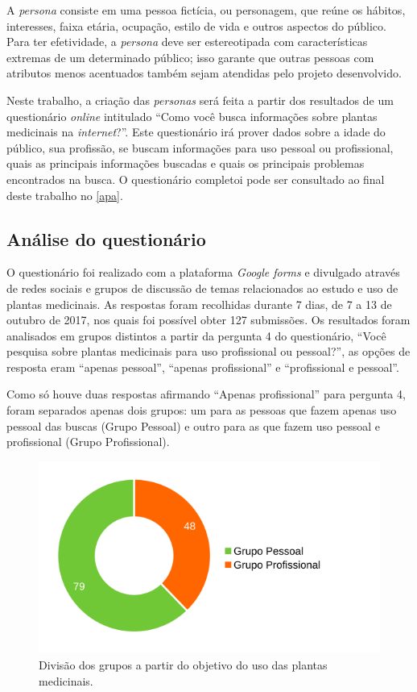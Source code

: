 A \emph{persona} consiste em uma pessoa fictícia, ou personagem, que reúne os hábitos, interesses, faixa etária, ocupação, estilo de vida e outros aspectos do público. Para ter efetividade, a \emph{persona} deve ser estereotipada com características extremas de um determinado público; isso garante que outras pessoas com atributos menos acentuados também sejam atendidas pelo projeto desenvolvido.

Neste trabalho, a criação das \emph{personas} será feita a partir dos resultados de um questionário \emph{online} intitulado ``Como você busca informações sobre plantas medicinais na \emph{internet}?''. Este questionário irá prover dados sobre a idade do público, sua profissão, se buscam informações para uso pessoal ou profissional, quais as principais informações buscadas e quais os principais problemas encontrados na busca. O questionário completoi pode ser consultado ao final deste trabalho no \autoref{apa}.

\subsection{Análise do questionário}\label{analise-do-questionario}

O questionário foi realizado com a plataforma \emph{Google forms} e divulgado através de redes sociais e grupos de discussão de temas relacionados ao estudo e uso de plantas medicinais. As respostas foram recolhidas durante 7 dias, de 7 a 13 de outubro de 2017, nos quais foi possível obter 127 submissões. Os resultados foram analisados em grupos distintos a partir da pergunta 4 do questionário, ``Você pesquisa sobre plantas medicinais para uso profissional ou pessoal?'', as opções de resposta eram ``apenas pessoal'', ``apenas profissional'' e ``profissional e pessoal''.

Como só houve duas respostas afirmando ``Apenas profissional'' para pergunta 4, foram separados apenas dois grupos: um para as pessoas que fazem apenas uso pessoal das buscas (Grupo Pessoal) e outro para as que fazem uso pessoal e profissional (Grupo Profissional).

\begin{figure}[!htbp]
\centering
\caption{\label{graf-propes}Divisão dos grupos a partir do objetivo do uso das plantas medicinais.}
\includegraphics[width=\textwidth]{images/pro-pes.png}
\end{figure}


